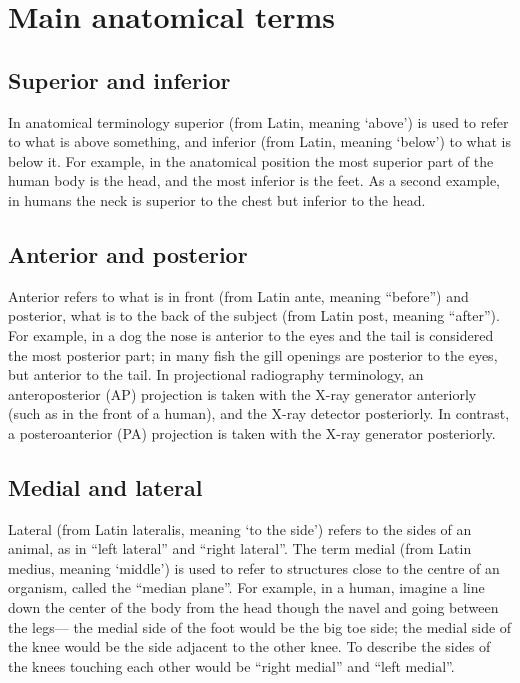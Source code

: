 \hypertarget{main-anatomical-terms}{%
\section{Main anatomical terms}\label{main-anatomical-terms}}

\hypertarget{superior-and-inferior}{%
\subsection{Superior and inferior}\label{superior-and-inferior}}

In anatomical terminology superior (from Latin, meaning `above') is used to refer to what is above something, and inferior (from Latin, meaning `below') to what is below it. For example, in the anatomical position the most superior part of the human body is the head, and the most inferior is the feet. As a second example, in humans the neck is superior to the chest but inferior to the head.

\hypertarget{anterior-and-posterior}{%
\subsection{Anterior and posterior}\label{anterior-and-posterior}}

Anterior refers to what is in front (from Latin ante, meaning ``before'') and posterior, what is to the back of the subject (from Latin post, meaning ``after''). For example, in a dog the nose is anterior to the eyes and the tail is considered the most posterior part; in many fish the gill openings are posterior to the eyes, but anterior to the tail. In projectional radiography terminology, an anteroposterior (AP) projection is taken with the X-ray generator anteriorly (such as in the front of a human), and the X-ray detector posteriorly. In contrast, a posteroanterior (PA) projection is taken with the X-ray generator posteriorly.

\hypertarget{medial-and-lateral}{%
\subsection{Medial and lateral}\label{medial-and-lateral}}

Lateral (from Latin lateralis, meaning `to the side') refers to the sides of an animal, as in ``left lateral'' and ``right lateral''. The term medial (from Latin medius, meaning `middle') is used to refer to structures close to the centre of an organism, called the ``median plane''. For example, in a human, imagine a line down the center of the body from the head though the navel and going between the legs--- the medial side of the foot would be the big toe side; the medial side of the knee would be the side adjacent to the other knee. To describe the sides of the knees touching each other would be ``right medial'' and ``left medial''.

